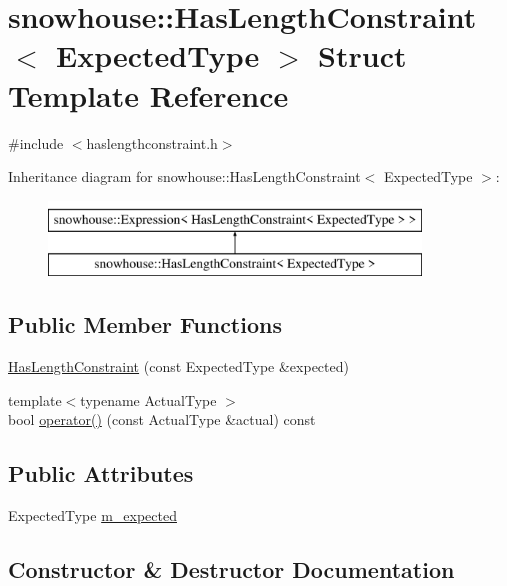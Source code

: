 \hypertarget{structsnowhouse_1_1HasLengthConstraint}{}\section{snowhouse\+::Has\+Length\+Constraint$<$ Expected\+Type $>$ Struct Template Reference}
\label{structsnowhouse_1_1HasLengthConstraint}


{\ttfamily \#include $<$haslengthconstraint.\+h$>$}

Inheritance diagram for snowhouse\+::Has\+Length\+Constraint$<$ Expected\+Type $>$\+:\begin{figure}[H]
\begin{center}
\leavevmode
\includegraphics[height=2.000000cm]{structsnowhouse_1_1HasLengthConstraint}
\end{center}
\end{figure}
\subsection*{Public Member Functions}
\begin{DoxyCompactItemize}
\item 
\mbox{\hyperlink{structsnowhouse_1_1HasLengthConstraint_aa6e96ace99b38ac7325f477dbb95b7ff}{Has\+Length\+Constraint}} (const Expected\+Type \&expected)
\item 
{\footnotesize template$<$typename Actual\+Type $>$ }\\bool \mbox{\hyperlink{structsnowhouse_1_1HasLengthConstraint_aacbc852671aa3d039b41e150e3269b69}{operator()}} (const Actual\+Type \&actual) const
\end{DoxyCompactItemize}
\subsection*{Public Attributes}
\begin{DoxyCompactItemize}
\item 
Expected\+Type \mbox{\hyperlink{structsnowhouse_1_1HasLengthConstraint_a7e4330a1c135acd8a9fb3dbcc819fb59}{m\+\_\+expected}}
\end{DoxyCompactItemize}


\subsection{Constructor \& Destructor Documentation}
\mbox{\label{structsnowhouse_1_1HasLengthConstraint_aa6e96ace99b38ac7325f477dbb95b7ff}} 
